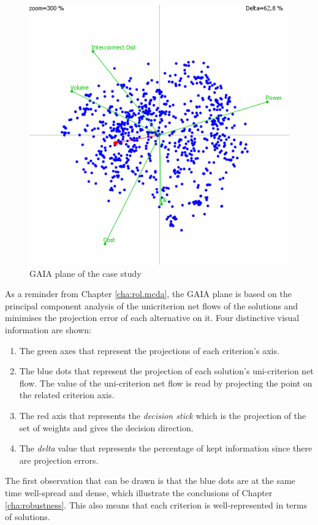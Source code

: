 \begin{figure}[h!]
\begin{center}
\includegraphics[width=0.8\linewidth]{gva804}
\end{center}
\caption{GAIA plane of the case study}
\label{fig:gva804}
\end{figure}

As a reminder from Chapter \ref{cha:rol.mcda}, the GAIA plane is based on the principal component analysis of the unicriterion net flows of the solutions and minimises the projection error of each alternative on it. Four distinctive visual information are shown:
\begin{enumerate}
\item The green axes that represent the projections of each criterion's axis.
\item The blue dots that represent the projection of each solution's uni-criterion net flow. The value of the uni-criterion net flow is read by projecting the point on the related criterion axis.
\item The red axis that represents the \textit{decision stick} which is the projection of the set of weights and gives the decision direction.
\item The \textit{delta} value that represents the percentage of kept information since there are projection errors.
\end{enumerate}

The first observation that can be drawn is that the blue dots are at the same time well-spread and dense, which illustrate the conclusions of Chapter \ref{cha:robustness}. This also means that each criterion is well-represented in terms of solutions.

